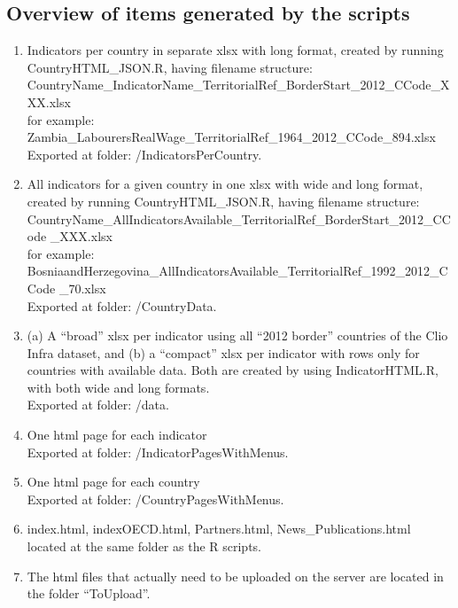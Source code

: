 \documentclass[a4paper]{article}
\begin{document}
\subsection{Overview of items generated by the scripts}

\begin{enumerate}
 \item Indicators per country in separate xlsx with long format, created by 
running CountryHTML\_JSON.R, having filename structure:\\
CountryName\_IndicatorName\_TerritorialRef\_BorderStart\_2012\_CCode\_XXX.xlsx\\
for example: 
Zambia\_LabourersRealWage\_TerritorialRef\_1964\_2012\_CCode\_894.xlsx\\
Exported at folder: /IndicatorsPerCountry.

 \item All indicators for a given country in one xlsx with wide and long 
format, created by running CountryHTML\_JSON.R, having filename structure:\\
CountryName\_AllIndicatorsAvailable\_TerritorialRef\_BorderStart\_2012\_CCode
\_XXX.xlsx\\ for example:
BosniaandHerzegovina\_AllIndicatorsAvailable\_TerritorialRef\_1992\_2012\_CCode
\_70.xlsx \\
Exported at folder: /CountryData.

 \item (a) A ``broad'' xlsx per indicator using all ``2012 border'' countries 
of the Clio Infra dataset, and (b) a ``compact'' xlsx per indicator with rows 
only for countries with available data. Both are created by using 
IndicatorHTML.R, with both wide and long formats.\\
Exported at folder: /data.

 \item One html page for each indicator\\
Exported at folder: /IndicatorPagesWithMenus.

 \item One html page for each country\\
Exported at folder: /CountryPagesWithMenus.

 \item index.html, indexOECD.html, Partners.html, News\_Publications.html 
located at the same folder as the R scripts.
  
 \item The html files that actually need to be uploaded on the server are 
located in the folder ``ToUpload''.
 
\end{enumerate}
\end{document}
